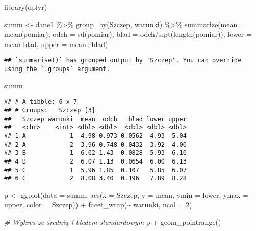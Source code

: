 \documentclass[
]{book}
\newenvironment{Shaded}{\begin{snugshade}}{\end{snugshade}}
\newcommand{\AttributeTok}[1]{\textcolor[rgb]{0.77,0.63,0.00}{#1}}
\newcommand{\CommentTok}[1]{\textcolor[rgb]{0.56,0.35,0.01}{\textit{#1}}}
\newcommand{\DecValTok}[1]{\textcolor[rgb]{0.00,0.00,0.81}{#1}}
\newcommand{\FunctionTok}[1]{\textcolor[rgb]{0.00,0.00,0.00}{#1}}
\newcommand{\NormalTok}[1]{#1}
\newcommand{\OtherTok}[1]{\textcolor[rgb]{0.56,0.35,0.01}{#1}}
\newcommand{\SpecialCharTok}[1]{\textcolor[rgb]{0.00,0.00,0.00}{#1}}
\begin{document}
\begin{Shaded}
\begin{Highlighting}[]
\FunctionTok{library}\NormalTok{(dplyr)}

\NormalTok{summ }\OtherTok{\textless{}{-}}\NormalTok{ dane1 }\SpecialCharTok{\%\textgreater{}\%} \FunctionTok{group\_by}\NormalTok{(Szczep, warunki) }\SpecialCharTok{\%\textgreater{}\%} 
  \FunctionTok{summarize}\NormalTok{(}\AttributeTok{mean =} \FunctionTok{mean}\NormalTok{(pomiar), }\AttributeTok{odch =} \FunctionTok{sd}\NormalTok{(pomiar), }
            \AttributeTok{blad =}\NormalTok{ odch}\SpecialCharTok{/}\FunctionTok{sqrt}\NormalTok{(}\FunctionTok{length}\NormalTok{(pomiar)),}
            \AttributeTok{lower =}\NormalTok{ mean}\SpecialCharTok{{-}}\NormalTok{blad, }
            \AttributeTok{upper =}\NormalTok{ mean}\SpecialCharTok{+}\NormalTok{blad)}
\end{Highlighting}
\end{Shaded}

\begin{verbatim}
## `summarise()` has grouped output by 'Szczep'. You can override using the `.groups` argument.
\end{verbatim}

\begin{Shaded}
\begin{Highlighting}[]
\NormalTok{summ}
\end{Highlighting}
\end{Shaded}

\begin{verbatim}
## # A tibble: 6 x 7
## # Groups:   Szczep [3]
##   Szczep warunki  mean  odch   blad lower upper
##   <chr>    <int> <dbl> <dbl>  <dbl> <dbl> <dbl>
## 1 A            1  4.98 0.973 0.0562  4.93  5.04
## 2 A            2  3.96 0.748 0.0432  3.92  4.00
## 3 B            1  6.02 1.43  0.0828  5.93  6.10
## 4 B            2  6.07 1.13  0.0654  6.00  6.13
## 5 C            1  5.96 1.85  0.107   5.85  6.07
## 6 C            2  8.08 3.40  0.196   7.89  8.28
\end{verbatim}

\begin{Shaded}
\begin{Highlighting}[]
\NormalTok{p }\OtherTok{\textless{}{-}} \FunctionTok{ggplot}\NormalTok{(}\AttributeTok{data =}\NormalTok{ summ, }\FunctionTok{aes}\NormalTok{(}\AttributeTok{x =}\NormalTok{ Szczep, }\AttributeTok{y =}\NormalTok{ mean, }\AttributeTok{ymin =}\NormalTok{ lower, }\AttributeTok{ymax =}\NormalTok{ upper, }
                             \AttributeTok{color =}\NormalTok{ Szczep)) }\SpecialCharTok{+} \FunctionTok{facet\_wrap}\NormalTok{(}\SpecialCharTok{\textasciitilde{}}\NormalTok{ warunki, }\AttributeTok{ncol =} \DecValTok{2}\NormalTok{)}

\CommentTok{\# Wykres ze średnią i błędem standardowym}
\NormalTok{p }\SpecialCharTok{+} \FunctionTok{geom\_pointrange}\NormalTok{()}
\end{Highlighting}
\end{Shaded}
\end{document}
